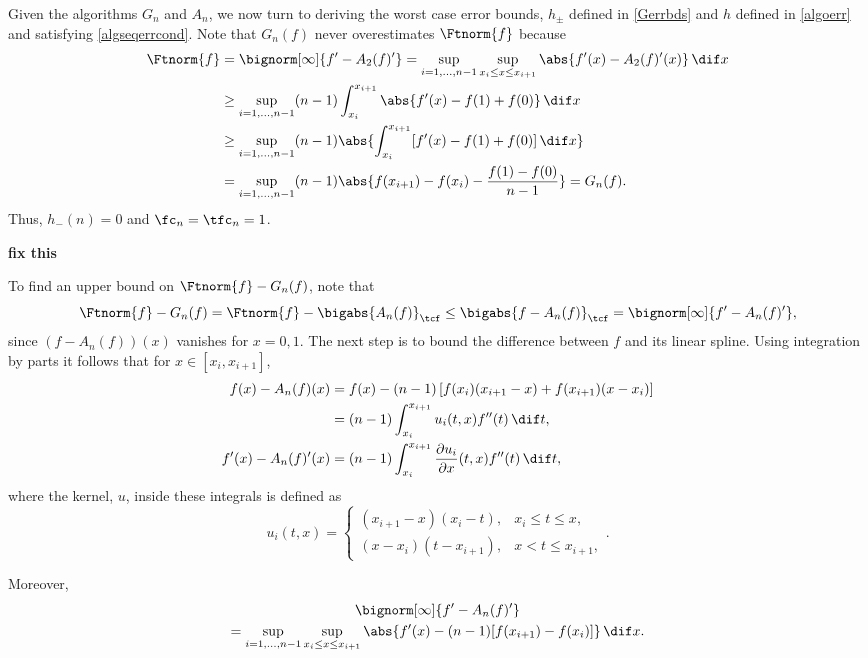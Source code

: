 Given the algorithms $G_n$ and $A_n$, we now turn to deriving the worst case error bounds, $h_{\pm}$ defined in \eqref{Gerrbds} and $h$ defined in \eqref{algoerr} and satisfying \eqref{algseqerrcond}.  
Note that $G_{n}(f)$ never overestimates $\Ftnorm{f}$ because 
\begin{align*}
\Ftnorm{f} & = \bignorm[\infty]{f'-A_2(f)'} 
= \sup_{i=1, ..., n-1} \sup_{x_i \le x \le x_{i+1}} \abs{f'(x) - A_2(f)'(x)} \, \dif x \\
&\ge \sup_{i=1, ..., n-1} (n-1)\int_{x_i}^{x_{i+1}} \abs{f'(x) - f(1)+f(0)} \, \dif x \\
&\ge \sup_{i=1, ..., n-1} (n-1)\abs{\int_{x_i}^{x_{i+1}} [f'(x) - f(1)+f(0)] \, \dif x }\\
&= \sup_{i=1, ..., n-1} (n-1)\abs{f(x_{i+1})-f(x_i) - \frac{f(1)-f(0)}{n-1}} = G_n(f).
\end{align*}
Thus, $h_{-}(n)=0$ and $\fc_n=\tfc_n=1$. 

{\bf fix this}


To find an upper bound on $\Ftnorm{f}-G_{n}(f)$, note that 
\begin{equation*}
\Ftnorm{f} - G_{n}(f) = \Ftnorm{f} - \bigabs{A_n(f)}_{\tcf} \le \bigabs{f-A_n(f)}_{\tcf} = \bignorm[\infty]{f' -A_n(f)'},
\end{equation*}
since $(f-A_n(f))(x)$ vanishes for $x=0,1$.  The next step is to bound the difference between $f$ and its linear spline.  Using integration by parts it follows that for $x \in [x_i,x_{i+1}]$, 
\begin{align}
\nonumber
f(x)-A_n (f)(x)
&= f(x) - (n-1) \left[f(x_{i})(x_{i+1}-x) +f(x_{i+1})(x-x_i) \right]\\
& = (n-1) \int_{x_i}^{x_{i+1}} u_i(t,x) f''(t) \, \dif t, \label{fintermsfdoubprime}\\
f'(x)-A_n(f)'(x) & = (n-1) \int_{x_i}^{x_{i+1}} \frac{\partial u_i}{\partial x}(t,x) f''(t) \, \dif t, \label{fprimeintermsfdoubprime}
\end{align}
where the kernel, $u$, inside these integrals is defined as
\begin{equation*}
u_i(t,x) =\begin{cases} (x_{i+1}-x)(x_i-t), & x_i\leq t\leq x,\\
(x-x_{i})(t- x_{i+1}), & x< t \leq x_{i+1},
\end{cases}.
\end{equation*}



Moreover, 
\begin{multline} \label{infnormfp}
\bignorm[\infty]{f' -A_n(f)'} \\
= \sup_{i=1, \ldots, n-1} \sup_{x_i \le x \le x_{i+1}} \abs{f'(x) -(n-1)[f(x_{i+1})-f(x_i)]} \, \dif x.
\end{multline}


